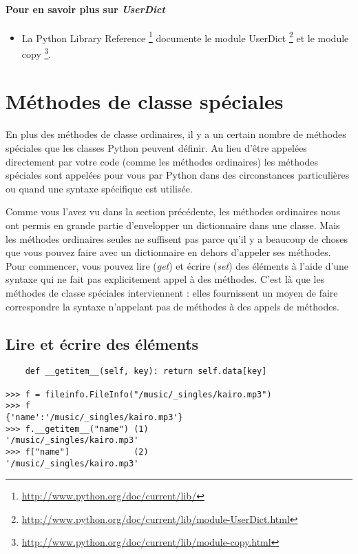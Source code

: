\paragraph{Pour en savoir plus sur \emph{UserDict}}
\begin{itemize}
  \item La Python Library Reference \footnote{\url{http://www.python.org/doc/current/lib/}} documente le module UserDict \footnote{\url{http://www.python.org/doc/current/lib/module-UserDict.html}} et le module copy \footnote{\url{http://www.python.org/doc/current/lib/module-copy.html}}.
\end{itemize}

\section{Méthodes de classe spéciales}

En plus des méthodes de classe ordinaires, il y a un certain nombre de méthodes spéciales que les classes Python peuvent définir. Au lieu d'être appelées  directement par votre code (comme les méthodes ordinaires) les méthodes spéciales sont appelées pour vous par Python dans des circonstances particulières ou quand une syntaxe spécifique est utilisée.

Comme vous l'avez vu dans la section précédente, les méthodes ordinaires nous ont permis en grande partie d'envelopper un dictionnaire dans une classe. Mais les méthodes ordinaires seules ne suffisent pas parce qu'il y a beaucoup de choses que vous pouvez faire avec un dictionnaire en dehors d'appeler ses méthodes. Pour commencer, vous pouvez lire (\emph{get}) et écrire (\emph{set}) des éléments à l'aide d'une syntaxe qui ne fait pas explicitement appel à des méthodes. C'est là que les méthodes de classe spéciales interviennent : elles fournissent un moyen de faire correspondre la syntaxe n'appelant pas de méthodes à des appels de méthodes.

\subsection{Lire et écrire des éléments}

\begin{example}
\begin{lstlisting}
    def __getitem__(self, key): return self.data[key]

>>> f = fileinfo.FileInfo("/music/_singles/kairo.mp3")
>>> f
{'name':'/music/_singles/kairo.mp3'}
>>> f.__getitem__("name") (1)
'/music/_singles/kairo.mp3'
>>> f["name"]             (2)
'/music/_singles/kairo.mp3'
\end{lstlisting}
\end{example}

